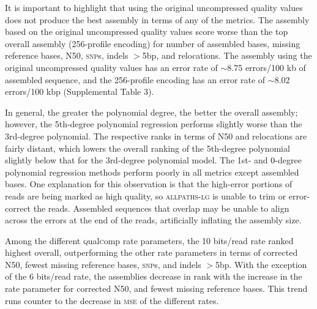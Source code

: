 \documentclass{bioinfo}
\begin{document}
It is important to highlight that using the original uncompressed
quality values does not produce the best assembly in terms of any of
the metrics. The assembly based on the original uncompressed quality
values score worse than the top overall assembly (256-profile
encoding) for number of assembled bases, missing reference bases, N50,
\textsc{snp}s, indels $>$5bp, and relocations. The assembly using the
original uncompressed quality values has an error rate of $\sim$8.75
errors/100 kb of assembled sequence, and the 256-profile encoding has
an error rate of $\sim$8.02 errors/100 kbp (Supplemental Table 3).

In general, the greater the polynomial degree, the better the overall
assembly; however, the 5th-degree polynomial regression performs
slightly worse than the 3rd-degree polynomial. The respective ranks in
terms of N50 and relocations are fairly distant, which lowers the
overall ranking of the 5th-degree polynomial slightly below that for
the 3rd-degree polynomial model. The 1st- and 0-degree polynomial
regression methods perform poorly in all metrics except assembled
bases. One explanation for this observation is that the high-error
portions of reads are being marked as high quality, so
\textsc{allpaths-lg} is unable to trim or error-correct the
reads. Assembled sequences that overlap may be unable to align across
the errors at the end of the reads, artificially inflating the
assembly size.

Among the different \textsc{q}ual\textsc{c}omp rate parameters, the 10
bits/read rate ranked highest overall, outperforming the other rate
parameters in terms of corrected N50, fewest missing reference bases,
\textsc{snp}s, and indels $>$5bp. With the exception of the 6
bits/read rate, the assemblies decrease in rank with the increase in
the rate parameter for corrected N50, and fewest missing reference
bases. This trend runs counter to the decrease in \textsc{mse} of the
different rates.
\end{document}
